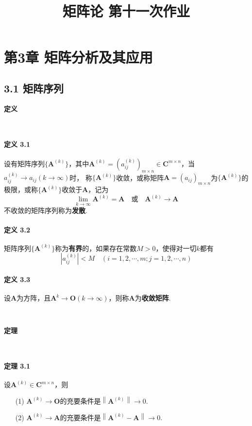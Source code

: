 \documentclass[12pt, a4paper, oneside, fontset=none]{ctexart}
\author{}
\date{}
\title{\vspace{-3em}\textbf{矩阵论 \quad 第十一次作业}\vspace{-3em}}
\begin{document}
\maketitle

\section*{第3章 \quad 矩阵分析及其应用}

\subsection*{3.1 \quad 矩阵序列}

\centerline{\large{\textbf{定义}}} \ \par

\paragraph*{定义 3.1} 设有矩阵序列$\{\bm{A}^{(k)}\}$，其中$\bm{A}^{(k)} = (a_{ij}^(k))_{m\times n} \in \bm{C}^{m\times n}$，当$a_{ij}^{(k)} \to a_{ij}(k\to \infty)$时，
称$\{\bm{A}^(k)\}$收敛，或称矩阵$\bm{A} = (a_{ij})_{m\times n}$为$\{\bm{A}^(k)\}$的极限，或称$\{\bm{A}^(k)\}$收敛于$\bm{A}$，记为
\[
    \lim_{k\to \infty}\bm{A}^{(k)} = \bm{A} \quad 或 \quad \bm{A}^{(k)} \to \bm{A}
\]
不收敛的矩阵序列称为\textbf{发散}.

\paragraph*{定义 3.2} 矩阵序列$\{\bm{A}^{(k)}\}$称为\textbf{有界}的，如果存在常数$M > 0$，使得对一切$k$都有
\[
    |a_{ij}^{(k)}| < M\quad (i = 1,2,\cdots,m;j = 1,2,\cdots,n)
\]

\paragraph*{定义 3.3} 设$\bm{A}$为方阵，且$\bm{A}^k \to \bm{O}(k \to \infty)$，则称$\bm{A}$为\textbf{收敛矩阵}.

\par \ \par

\centerline{\large{\textbf{定理}}} \ \par

\paragraph*{定理 3.1} 设$\bm{A}^{(k)} \in \bm{C}^{m\times n}$，则
\begin{enumerate}
    \item[(1)] $\bm{A}^{(k)} \to \bm{O}$的充要条件是$\left\lVert \bm{A}^{(k)} \right\rVert \to 0$.
    \item[(2)] $\bm{A}^{(k)} \to \bm{A}$的充要条件是$\left\lVert \bm{A}^{(k)} - \bm{A} \right\rVert \to 0$.
\end{enumerate}
\end{document}
